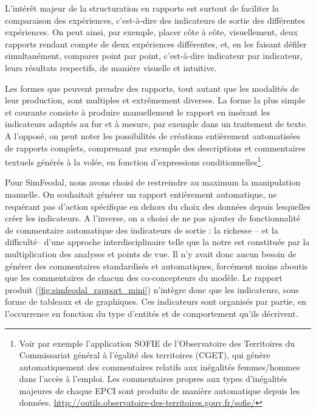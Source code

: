 	L'intérêt majeur de la structuration en rapports est surtout de faciliter la comparaison des expériences, c'est-à-dire des indicateurs de sortie des différentes expériences.
	On peut ainsi, par exemple, placer côte à côte, visuellement, deux rapports rendant compte de deux expériences différentes, et, en les faisant défiler simultanément, comparer point par point, c'est-à-dire indicateur par indicateur, leurs résultats respectifs, de manière visuelle et intuitive.

	Les formes que peuvent prendre des rapports, tout autant que les modalités de leur production, sont multiples et extrêmement diverses.
	La forme la plus simple et courante consiste à produire manuellement le rapport en insérant les indicateurs adaptés au fur et à mesure, par exemple dans un traitement de texte.
	A l'opposé, on peut noter les possibilités de créations entièrement automatisées de rapports complets, comprenant par exemple des descriptions et commentaires textuels générés à la volée, en fonction d'expressions conditionnelles\footnote{Voir par exemple l'application \og SOFIE\fg{} de l'Observatoire des Territoires du Commissariat général à l'égalité des territoires (CGET), qui génère automatiquement des commentaires relatifs aux inégalités femmes/hommes dans l'accès à l'emploi. Les commentaires propres aux types d'inégalités majeures de chaque EPCI sont produits de manière automatique depuis les données. \href{http://outils.observatoire-des-territoires.gouv.fr/sofie/}{http://outils.observatoire-des-territoires.gouv.fr/sofie/}
	}.

	Pour SimFeodal, nous avons choisi de restreindre au maximum la manipulation manuelle.
	On souhaitait générer un rapport entièrement automatique, ne requérant pas d'action spécifique en dehors du choix des données depuis lesquelles créer les indicateurs.
	A l'inverse, on a choisi de ne pas ajouter de fonctionnalité de commentaire automatique des indicateurs de sortie : la richesse -- et la difficulté-- d'une approche interdisciplinaire telle que la notre est constituée par la multiplication des analyses et points de vue.
	Il n'y avait donc aucun besoin de générer des commentaires standardisés et automatiques, forcément moins aboutis que les commentaires de chacun des co-concepteurs du modèle.
	Le rapport produit (\cref{fig:simfeodal_rapport_mini}) n'intègre donc que les indicateurs, sous forme de tableaux et de graphiques.
	Ces indicateurs sont organisés par partie, en l'occurrence en fonction du type d'entités et de comportement qu'ils décrivent.

